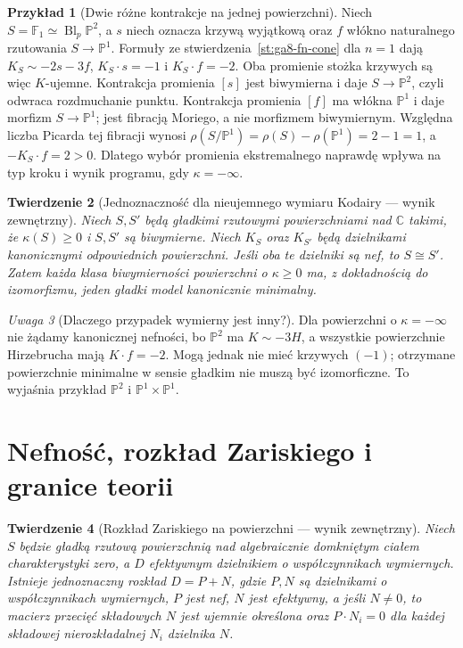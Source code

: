 \documentclass[11pt,a4paper,openany]{report}
\numberwithin{equation}{section}
\theoremstyle{plain}
\newtheorem{twierdzenie}{Twierdzenie}[section]
\theoremstyle{definition}
\newtheorem{przyklad}[twierdzenie]{Przykład}
\theoremstyle{remark}
\newtheorem{uwaga}[twierdzenie]{Uwaga}
\newcommand{\C}{\mathbb C}
\newcommand{\PP}{\mathbb P}
\begin{document}
\begin{przyklad}[Dwie różne kontrakcje na jednej powierzchni]
\label{prz:ga8-f1-two-rays}
Niech $S=\mathbb F_1\simeq\operatorname{Bl}_p\PP^2$, a $s$
niech oznacza krzywą wyjątkową oraz $f$ włókno
naturalnego rzutowania $S\to\PP^1$. Formuły
ze stwierdzenia~\ref{st:ga8-fn-cone} dla $n=1$ dają
$K_S\sim-2s-3f$, $K_S\cdot s=-1$ i $K_S\cdot f=-2$.
Oba promienie stożka krzywych są więc $K$-ujemne.
Kontrakcja promienia $[s]$ jest biwymierna i daje
$S\to\PP^2$, czyli odwraca rozdmuchanie punktu.
Kontrakcja promienia $[f]$ ma włókna $\PP^1$
i daje morfizm $S\to\PP^1$; jest fibracją Moriego,
a nie morfizmem biwymiernym. Względna liczba Picarda tej fibracji wynosi
$\rho(S/\PP^1)=\rho(S)-\rho(\PP^1)=2-1=1$,
a $-K_S\cdot f=2>0$.
Dlatego wybór promienia ekstremalnego naprawdę wpływa
na typ kroku i wynik programu, gdy $\kappa=-\infty$.
\end{przyklad}

\begin{twierdzenie}[Jednoznaczność dla nieujemnego wymiaru Kodairy — wynik zewnętrzny]
\label{tw:ga8-minimal-unique}
Niech $S,S'$ będą gładkimi rzutowymi powierzchniami
nad $\C$ takimi, że $\kappa(S)\ge0$ i $S,S'$
są biwymierne. Niech $K_S$ oraz $K_{S'}$ będą
dzielnikami kanonicznymi odpowiednich powierzchni.
Jeśli oba te dzielniki są nef, to $S\cong S'$. Zatem każda klasa biwymierności
powierzchni o $\kappa\ge0$ ma, z dokładnością do
izomorfizmu, jeden gładki model kanonicznie minimalny.
\end{twierdzenie}
\begin{uwaga}[Dlaczego przypadek wymierny jest inny?]
Dla powierzchni o $\kappa=-\infty$ nie żądamy
kanonicznej nefności, bo $\PP^2$ ma $K\sim-3H$,
a wszystkie powierzchnie Hirzebrucha mają
$K\cdot f=-2$. Mogą jednak nie mieć krzywych
$(-1)$; otrzymane powierzchnie minimalne w sensie gładkim
nie muszą być izomorficzne. To wyjaśnia przykład
$\PP^2$ i $\PP^1\times\PP^1$.
\end{uwaga}

\section{Nefność, rozkład Zariskiego i granice teorii}
\label{sec:ga8-zariski-decomposition}

\begin{twierdzenie}[Rozkład Zariskiego na powierzchni — wynik zewnętrzny]
\label{tw:ga8-zariski-decomposition}
Niech $S$ będzie gładką rzutową powierzchnią nad
algebraicznie domkniętym ciałem charakterystyki zero,
a $D$ efektywnym dzielnikiem o współczynnikach wymiernych.
Istnieje jednoznaczny rozkład $D=P+N$, gdzie
$P,N$ są dzielnikami o współczynnikach wymiernych,
$P$ jest nef, $N$ jest efektywny, a jeśli $N\ne0$,
to macierz przecięć składowych $N$ jest ujemnie
określona oraz $P\cdot N_i=0$ dla każdej składowej
nierozkładalnej $N_i$ dzielnika $N$.
\end{twierdzenie}
\end{document}
